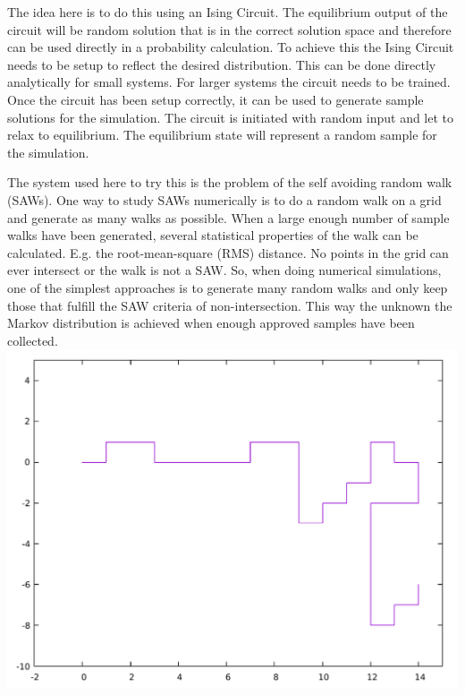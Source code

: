 \documentclass[11pt]{article}
\begin{document}
The idea here is to do this using an Ising Circuit. The equilibrium output of the circuit will be random solution that is in the correct solution space and therefore can be used directly in a probability calculation. To achieve this the Ising Circuit needs to be setup to reflect the desired distribution. This can be done directly analytically for small systems. For larger systems the circuit needs to be trained. Once the circuit has been setup correctly, it can be used to generate sample solutions for the simulation. The circuit is initiated with random input and let to relax to equilibrium. The equilibrium state will represent a random sample for the simulation.

The system used here to try this is the problem of the self avoiding random walk (SAWs). One way to study SAWs numerically is to do a random walk on a grid and generate as many walks as possible. When a large enough number of sample walks have been generated, several statistical properties of the walk can be calculated. E.g. the root-mean-square (RMS) distance. No points in the grid can ever intersect or the walk is not a SAW. So, when doing numerical simulations, one of the simplest approaches is to generate many random walks and only keep those that fulfill the SAW criteria of non-intersection. This way the unknown the Markov distribution is achieved when enough approved samples have been collected.
\includegraphics[scale=0.25]{images/saw_example.pdf}
\end{document}

